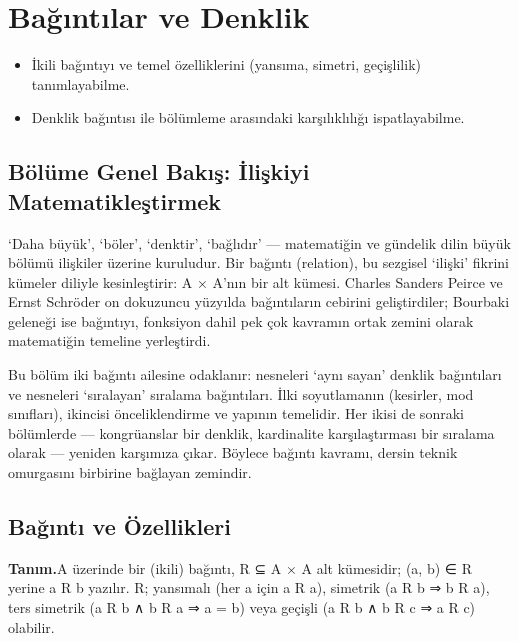 \chapter{Bağıntılar ve Denklik}
\label{chap:bagintilar}


\par{}\nopagebreak

\begin{itemize}\setlength{\itemsep}{2pt}\setlength{\parskip}{0pt}
\item İkili bağıntıyı ve temel özelliklerini (yansıma, simetri, geçişlilik) tanımlayabilme.
\item Denklik bağıntısı ile bölümleme arasındaki karşılıklılığı ispatlayabilme.
\end{itemize}

\section*{Bölüme Genel Bakış: İlişkiyi Matematikleştirmek}

‘Daha büyük’, ‘böler’, ‘denktir’, ‘bağlıdır’ — matematiğin ve gündelik dilin büyük bölümü ilişkiler üzerine kuruludur. Bir bağıntı (relation), bu sezgisel ‘ilişki’ fikrini kümeler diliyle kesinleştirir: A × A’nın bir alt kümesi. Charles Sanders Peirce ve Ernst Schröder on dokuzuncu yüzyılda bağıntıların cebirini geliştirdiler; Bourbaki geleneği ise bağıntıyı, fonksiyon dahil pek çok kavramın ortak zemini olarak matematiğin temeline yerleştirdi.

Bu bölüm iki bağıntı ailesine odaklanır: nesneleri ‘aynı sayan’ denklik bağıntıları ve nesneleri ‘sıralayan’ sıralama bağıntıları. İlki soyutlamanın (kesirler, mod sınıfları), ikincisi önceliklendirme ve yapının temelidir. Her ikisi de sonraki bölümlerde — kongrüanslar bir denklik, kardinalite karşılaştırması bir sıralama olarak — yeniden karşımıza çıkar. Böylece bağıntı kavramı, dersin teknik omurgasını birbirine bağlayan zemindir.

\section{Bağıntı ve Özellikleri}

\begin{tcolorbox}[bookbox,colback=cDef]\textbf{\textsf{\textcolor{cAcc}{Tanım.}}}\quad A üzerinde bir (ikili) bağıntı, R ⊆ A × A alt kümesidir; (a, b) ∈ R yerine a R b yazılır. R; yansımalı (her a için a R a), simetrik (a R b ⇒ b R a), ters simetrik (a R b ∧ b R a ⇒ a = b) veya geçişli (a R b ∧ b R c ⇒ a R c) olabilir.\end{tcolorbox}

